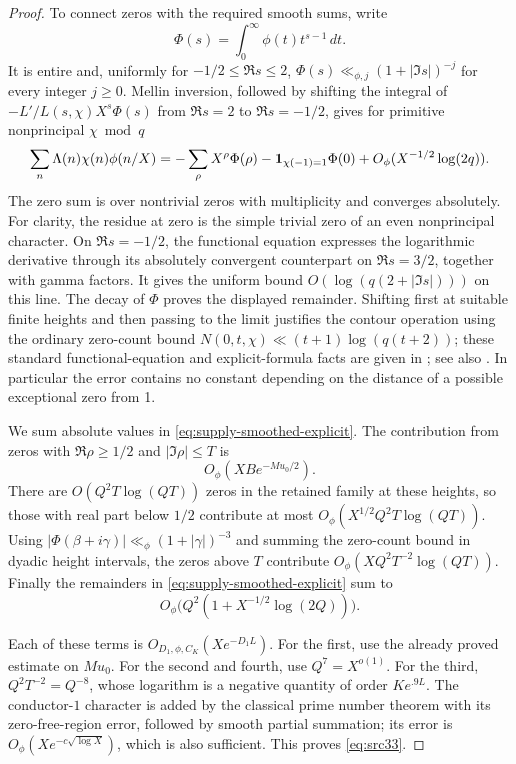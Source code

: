 \begin{proof}
To connect zeros with the required smooth sums, write
\[
 \Phi(s)=\int_0^\infty\phi(t)t^{s-1}\,dt.
\]
It is entire and, uniformly for \(-1/2\le\Re s\le2\),
\(\Phi(s)\ll_{\phi,j}(1+|\Im s|)^{-j}\) for every integer \(j\ge0\).
Mellin inversion, followed by shifting the integral of
\(-L'/L(s,\chi)X^s\Phi(s)\) from \(\Re s=2\) to
\(\Re s=-1/2\), gives for primitive nonprincipal \(\chi\bmod q\)
\begin{equation}\label{eq:supply-smoothed-explicit}
 \sum_n\Lambda(n)\chi(n)\phi(n/X)
 =-\sum_{\rho}X^\rho\Phi(\rho)
      -\mathbf 1_{\chi(-1)=1}\Phi(0)
      +O_\phi(X^{-1/2}\log(2q)).
\end{equation}
The zero sum is over nontrivial zeros with multiplicity and
converges absolutely. For clarity, the residue at zero is the
simple trivial zero of an even nonprincipal character.
On \(\Re s=-1/2\), the functional equation expresses the
logarithmic derivative through its absolutely convergent counterpart
on \(\Re s=3/2\), together with gamma factors. It gives the uniform
bound \(O(\log(q(2+|\Im s|)))\) on this line.
The decay of \(\Phi\) proves the displayed remainder.
Shifting first at suitable finite heights and then passing to the
limit justifies the contour operation using the ordinary zero-count
bound \(N(0,t,\chi)\ll (t+1)\log(q(t+2))\);
these standard functional-equation and explicit-formula facts are
given in \cite[Chapter~10]{MontgomeryVaughan2007}; see also
\cite[Sections~3.7.1 and~3.7.3]{Helfgott}.
In particular the error contains no constant depending on the
distance of a possible exceptional zero from 1.

We sum absolute values in \eqref{eq:supply-smoothed-explicit}.
The contribution from zeros with \(\Re\rho\ge1/2\) and
\(|\Im\rho|\le T\) is
\[
 O_\phi(XB e^{-Mu_0/2}).
\]
There are \(O(Q^2T\log(QT))\) zeros in the retained family at these
heights, so those with real part below \(1/2\) contribute at most
\(O_\phi(X^{1/2}Q^2T\log(QT))\).
Using \(|\Phi(\beta+i\gamma)|\ll_\phi(1+|\gamma|)^{-3}\)
and summing the zero-count bound in dyadic height intervals, the
zeros above \(T\) contribute
\(O_\phi(XQ^2T^{-2}\log(QT))\).
Finally the remainders in \eqref{eq:supply-smoothed-explicit} sum to
\[
 O_\phi\bigl(Q^2(1+X^{-1/2}\log(2Q))\bigr).
\]

Each of these terms is \(O_{D_1,\phi,C_K}(Xe^{-D_1L})\).
For the first, use the already proved estimate on \(Mu_0\).
For the second and fourth, use \(Q^7=X^{o(1)}\).
For the third, \(Q^2T^{-2}=Q^{-8}\), whose logarithm is a
negative quantity of order \(K e^{.9L}\).
The conductor-\(1\) character is added by the classical prime
number theorem with its zero-free-region error, followed by smooth
partial summation; its error is
\(O_\phi(Xe^{-c\sqrt{\log X}})\), which is also sufficient.
This proves \eqref{eq:src33}.
\end{proof}

